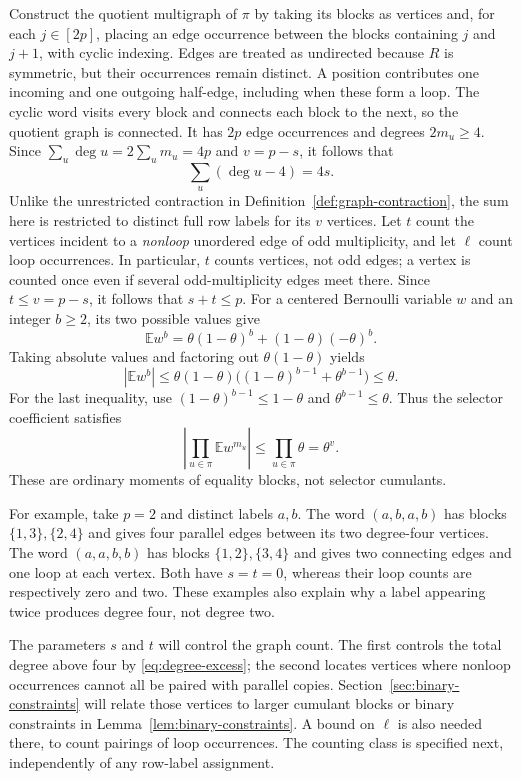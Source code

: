 \documentclass[11pt]{article}
\theoremstyle{definition}
\theoremstyle{remark}
\theoremstyle{plain}
\newcommand{\E}{\mathbb E}
\begin{document}
Construct the quotient multigraph of $\pi$ by taking its blocks as vertices
and, for each $j\in[2p]$, placing an edge occurrence between the
blocks containing $j$ and $j+1$, with cyclic indexing.
Edges are treated as undirected because $R$ is symmetric, but
their occurrences remain distinct. A position contributes one
incoming and one outgoing half-edge, including when these form a
loop. The cyclic word visits every block and connects each block to
the next, so the quotient graph is connected. It has \(2p\) edge
occurrences and degrees \(2m_u\ge4\). Since
$\sum_u\deg u=2\sum_u m_u=4p$ and $v=p-s$, it follows that
\begin{equation}\label{eq:degree-excess}
                         \sum_u(\deg u-4)=4s.
\end{equation}
Unlike the unrestricted contraction in
Definition~\ref{def:graph-contraction}, the sum here is restricted
to distinct full row labels for its \(v\) vertices.
Let \(t\) count the vertices incident to a
\emph{nonloop} unordered edge of odd multiplicity, and let \(\ell\)
count loop occurrences. In particular, $t$ counts vertices, not odd
edges; a vertex is counted once even if several odd-multiplicity
edges meet there. Since $t\le v=p-s$, it follows that \(s+t\le p\).
For a centered Bernoulli variable \(w\) and an integer \(b\ge2\),
its two possible values give
\[
 \E w^b=\theta(1-\theta)^b+(1-\theta)(-\theta)^b.
\]
Taking absolute values and factoring out $\theta(1-\theta)$ yields
\begin{equation}\label{eq:selector-moment}
 |\E w^b|
 \le\theta(1-\theta)\big((1-\theta)^{b-1}+\theta^{b-1}\big)
 \le\theta.
\end{equation}
For the last inequality, use $(1-\theta)^{b-1}\le1-\theta$ and
$\theta^{b-1}\le\theta$. Thus the selector coefficient satisfies
\[
 \left|\prod_{u\in\pi}\E w^{m_u}\right|
 \le\prod_{u\in\pi}\theta=\theta^v.
\]
These are ordinary moments of equality blocks, not selector cumulants.

For example, take $p=2$ and distinct labels $a,b$. The word
$(a,b,a,b)$ has blocks $\{1,3\},\{2,4\}$ and gives four parallel
edges between its two degree-four vertices. The word $(a,a,b,b)$
has blocks $\{1,2\},\{3,4\}$ and gives two connecting edges and one
loop at each vertex. Both have $s=t=0$, whereas their loop counts
are respectively zero and two. These examples also explain why a
label appearing twice produces degree four, not degree two.

The parameters $s$ and $t$ will control the graph count. The first
controls the total degree above four by \eqref{eq:degree-excess};
the second locates vertices where nonloop occurrences cannot all be
paired with parallel copies. Section~\ref{sec:binary-constraints}
will relate those vertices to larger cumulant blocks or binary
constraints in Lemma~\ref{lem:binary-constraints}. A
bound on $\ell$ is also needed there, to count pairings
of loop occurrences. The counting class is specified next, independently
of any row-label assignment.
\end{document}

